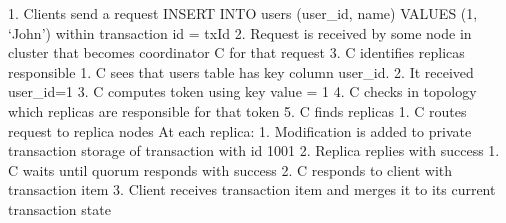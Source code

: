 

1. Clients send a request INSERT INTO users (user_id, name) VALUES (1, ‘John’) within transaction id = txId
2. Request is received by some node in cluster that becomes coordinator C for that request
3. C identifies replicas responsible
   1. C sees that users table has key column user_id. 
   2. It received user_id=1
   3. C computes token using key value = 1 
   4. C checks in topology which replicas are responsible for that token
   5. C finds replicas
1. C routes request to replica nodes
At each replica:
   1. Modification is added to private transaction storage of transaction with id 1001
   2. Replica replies with success
1. C waits until quorum responds with success
2. C responds to client with transaction item
3. Client receives transaction item and merges it to its current transaction state

